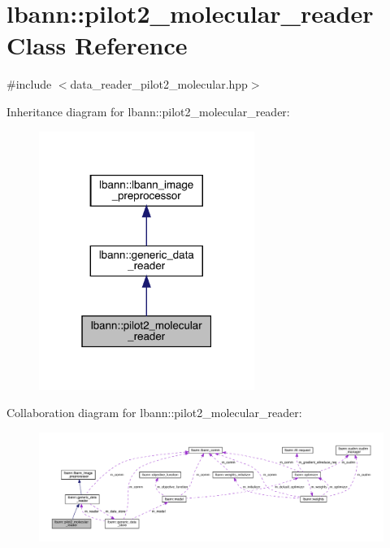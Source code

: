 \hypertarget{classlbann_1_1pilot2__molecular__reader}{}\section{lbann\+:\+:pilot2\+\_\+molecular\+\_\+reader Class Reference}
\label{classlbann_1_1pilot2__molecular__reader}


{\ttfamily \#include $<$data\+\_\+reader\+\_\+pilot2\+\_\+molecular.\+hpp$>$}



Inheritance diagram for lbann\+:\+:pilot2\+\_\+molecular\+\_\+reader\+:\nopagebreak
\begin{figure}[H]
\begin{center}
\leavevmode
\includegraphics[width=199pt]{classlbann_1_1pilot2__molecular__reader__inherit__graph}
\end{center}
\end{figure}


Collaboration diagram for lbann\+:\+:pilot2\+\_\+molecular\+\_\+reader\+:\nopagebreak
\begin{figure}[H]
\begin{center}
\leavevmode
\includegraphics[width=350pt]{classlbann_1_1pilot2__molecular__reader__coll__graph}
\end{center}
\end{figure}
